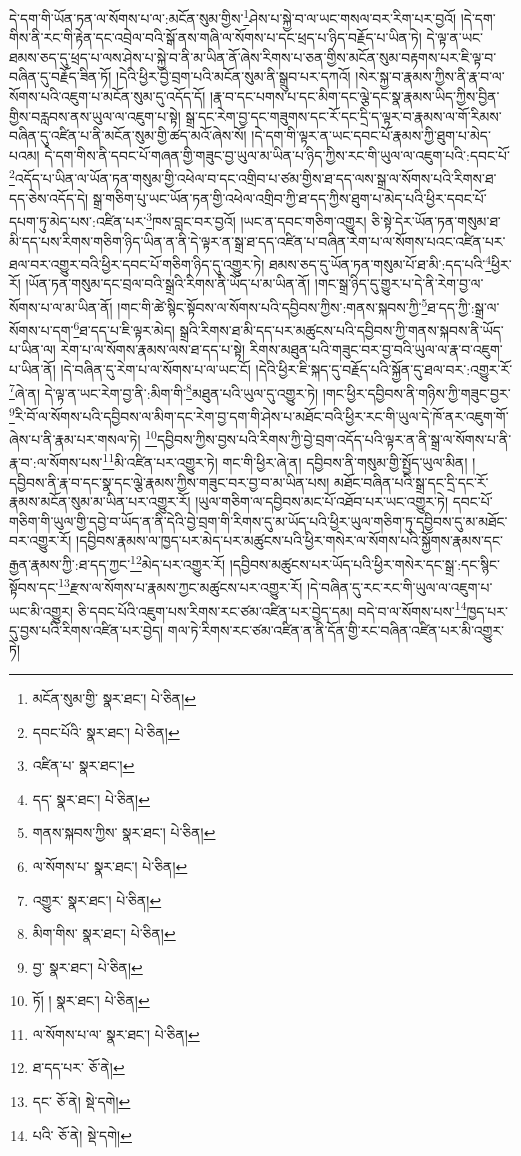 དེ་དག་གི་ཡོན་ཏན་ལ་སོགས་པ་ལ་:མངོན་སུམ་གྱིས་\footnote{མངོན་སུམ་གྱི་  སྣར་ཐང་།  པེ་ཅིན། }ཤེས་པ་སྐྱེ་བ་ལ་ཡང་གསལ་བར་རིག་པར་བྱའོ། །དེ་དག་གིས་ནི་རང་གི་རྟེན་དང་འབྲེལ་བའི་སྒོ་ནས་གཞི་ལ་སོགས་པ་དང་ཕྲད་པ་ཉིད་བརྗོད་པ་ཡིན་ཏེ། དེ་ལྟ་ན་ཡང་ཐམས་ཅད་དུ་ཕྲད་པ་ལས་ཤེས་པ་སྐྱེ་བ་ནི་མ་ཡིན་ནོ་ཞེས་རིགས་པ་ཅན་གྱིས་མངོན་སུམ་བརྟགས་པར་ཇི་ལྟ་བ་བཞིན་དུ་བརྗོད་ཟིན་ཏོ། །དེའི་ཕྱིར་བྱེ་བྲག་པའི་མངོན་སུམ་ནི་སྒྲུབ་པར་དཀའོ། །སེར་སྐྱ་བ་རྣམས་ཀྱིས་ནི་རྣ་བ་ལ་སོགས་པའི་འཇུག་པ་མངོན་སུམ་དུ་འདོད་དོ། །རྣ་བ་དང་པགས་པ་དང་མིག་དང་ལྕེ་དང་སྣ་རྣམས་ཡིད་ཀྱིས་བྱིན་གྱིས་བརླབས་ནས་ཡུལ་ལ་འཇུག་པ་སྟེ། སྒྲ་དང་རེག་བྱ་དང་གཟུགས་དང་རོ་དང་དྲི་ད་ལྟར་བ་རྣམས་ལ་གོ་རིམས་བཞིན་དུ་འཛིན་པ་ནི་མངོན་སུམ་གྱི་ཚད་མའོ་ཞེས་སོ། །དེ་དག་གི་ལྟར་ན་ཡང་དབང་པོ་རྣམས་ཀྱི་ཐུག་པ་མེད་པའམ། དེ་དག་གིས་ནི་དབང་པོ་གཞན་གྱི་གཟུང་བྱ་ཡུལ་མ་ཡིན་པ་ཉིད་ཀྱིས་རང་གི་ཡུལ་ལ་འཇུག་པའི་:དབང་པོ་\footnote{དབང་པོའི་  སྣར་ཐང་།  པེ་ཅིན། }འདོད་པ་ཡིན་ལ་ཡོན་ཏན་གསུམ་གྱི་འཕེལ་བ་དང་འགྲིབ་པ་ཙམ་གྱིས་ཐ་དད་ལས་སྒྲ་ལ་སོགས་པའི་རིགས་ཐ་དད་ཅེས་འདོད་དེ། སྒྲ་གཅིག་པུ་ཡང་ཡོན་ཏན་གྱི་འཕེལ་འགྲིབ་ཀྱི་ཐ་དད་ཀྱིས་ཐུག་པ་མེད་པའི་ཕྱིར་དབང་པོ་དཔག་ཏུ་མེད་པས་:འཛིན་པར་\footnote{འཛིན་པ་  སྣར་ཐང་། }ཁས་བླང་བར་བྱའོ། །ཡང་ན་དབང་གཅིག་འགྱུར། ཅི་སྟེ་དེར་ཡོན་ཏན་གསུམ་ཐ་མི་དད་པས་རིགས་གཅིག་ཉིད་ཡིན་ན་ནི་དེ་ལྟར་ན་སྒྲ་ཐ་དད་འཛིན་པ་བཞིན་རེག་པ་ལ་སོགས་པའང་འཛིན་པར་ཐལ་བར་འགྱུར་བའི་ཕྱིར་དབང་པོ་གཅིག་ཉིད་དུ་འགྱུར་ཏེ། ཐམས་ཅད་དུ་ཡོན་ཏན་གསུམ་པོ་ཐ་མི་:དད་པའི་\footnote{དད་  སྣར་ཐང་།  པེ་ཅིན། }ཕྱིར་རོ། །ཡོན་ཏན་གསུམ་དང་བྲལ་བའི་སྒྲའི་རིགས་ནི་ཡོད་པ་མ་ཡིན་ནོ། །གང་སྒྲ་ཉིད་དུ་གྱུར་པ་དེ་ནི་རེག་བྱ་ལ་སོགས་པ་ལ་མ་ཡིན་ནོ། །གང་གི་ཚེ་སྙིང་སྟོབས་ལ་སོགས་པའི་དབྱིབས་ཀྱིས་:གནས་སྐབས་ཀྱི་\footnote{གནས་སྐབས་ཀྱིས་  སྣར་ཐང་།  པེ་ཅིན། }ཐ་དད་ཀྱི་:སྒྲ་ལ་སོགས་པ་དག་\footnote{ལ་སོགས་པ་  སྣར་ཐང་།  པེ་ཅིན། }ཐ་དད་པ་ཇི་ལྟར་མེད། སྒྲའི་རིགས་ཐ་མི་དད་པར་མཚུངས་པའི་དབྱིབས་ཀྱི་གནས་སྐབས་ནི་ཡོད་པ་ཡིན་ལ། རེག་པ་ལ་སོགས་རྣམས་ལས་ཐ་དད་པ་སྟེ། རིགས་མཐུན་པའི་གཟུང་བར་བྱ་བའི་ཡུལ་ལ་རྣ་བ་འཇུག་པ་ཡིན་ནོ། །དེ་བཞིན་དུ་རེག་པ་ལ་སོགས་པ་ལ་ཡང་ངོ། །དེའི་ཕྱིར་ཇི་སྐད་དུ་བརྗོད་པའི་སྐྱོན་དུ་ཐལ་བར་:འགྱུར་རོ་\footnote{འགྱུར་  སྣར་ཐང་།  པེ་ཅིན། }ཞེ་ན། དེ་ལྟ་ན་ཡང་རེག་བྱ་ནི་:མིག་གི་\footnote{མིག་གིས་  སྣར་ཐང་།  པེ་ཅིན། }མཐུན་པའི་ཡུལ་དུ་འགྱུར་ཏེ། །གང་ཕྱིར་དབྱིབས་ནི་གཉིས་ཀྱི་གཟུང་བྱར་\footnote{བྱ་  སྣར་ཐང་།  པེ་ཅིན། }རི་བོ་ལ་སོགས་པའི་དབྱིབས་ལ་མིག་དང་རེག་བྱ་དག་གི་ཤེས་པ་མཐོང་བའི་ཕྱིར་རང་གི་ཡུལ་དེ་ཁོ་ནར་འཇུག་གོ་ཞེས་པ་ནི་རྣམ་པར་གསལ་ཏེ། \footnote{ཏོ། །   སྣར་ཐང་།  པེ་ཅིན། }དབྱིབས་ཀྱིས་བྱས་པའི་རིགས་ཀྱི་བྱེ་བྲག་འདོད་པའི་ལྟར་ན་ནི་སྒྲ་ལ་སོགས་པ་ནི་རྣ་བ་:ལ་སོགས་པས་\footnote{ལ་སོགས་པ་ལ་  སྣར་ཐང་།  པེ་ཅིན། }མི་འཛིན་པར་འགྱུར་ཏེ། གང་གི་ཕྱིར་ཞེ་ན། དབྱིབས་ནི་གསུམ་གྱི་སྤྱོད་ཡུལ་མིན། །དབྱིབས་ནི་རྣ་བ་དང་སྣ་དང་ལྕེ་རྣམས་ཀྱིས་གཟུང་བར་བྱ་བ་མ་ཡིན་པས། མཐོང་བཞིན་པའི་སྒྲ་དང་དྲི་དང་རོ་རྣམས་མངོན་སུམ་མ་ཡིན་པར་འགྱུར་རོ། །ཡུལ་གཅིག་ལ་དབྱིབས་མང་པོ་འཐོབ་པར་ཡང་འགྱུར་ཏེ། དབང་པོ་གཅིག་གི་ཡུལ་གྱི་དབྱེ་བ་ཡོད་ན་ནི་དེའི་བྱེ་བྲག་གི་རིགས་དུ་མ་ཡོད་པའི་ཕྱིར་ཡུལ་གཅིག་ཏུ་དབྱིབས་དུ་མ་མཐོང་བར་འགྱུར་རོ། །དབྱིབས་རྣམས་ལ་ཁྱད་པར་མེད་པར་མཚུངས་པའི་ཕྱིར་གསེར་ལ་སོགས་པའི་སྐྱོགས་རྣམས་དང་རྒྱན་རྣམས་ཀྱི་:ཐ་དད་ཀྱང་\footnote{ཐ་དད་པར་  ཅོ་ནེ། }མེད་པར་འགྱུར་རོ། །དབྱིབས་མཚུངས་པར་ཡོད་པའི་ཕྱིར་གསེར་དང་སྒྲ་:དང་སྙིང་སྟོབས་དང་\footnote{དང་  ཅོ་ནེ།  སྡེ་དགེ། }རྫས་ལ་སོགས་པ་རྣམས་ཀྱང་མཚུངས་པར་འགྱུར་རོ། །དེ་བཞིན་དུ་རང་རང་གི་ཡུལ་ལ་འཇུག་པ་ཡང་མི་འགྱུར། ཅི་དབང་པོའི་འཇུག་པས་རིགས་རང་ཙམ་འཛིན་པར་བྱེད་དམ། བདེ་བ་ལ་སོགས་པས་\footnote{པའི་  ཅོ་ནེ།  སྡེ་དགེ། }ཁྱད་པར་དུ་བྱས་པའི་རིགས་འཛིན་པར་བྱེད། གལ་ཏེ་རིགས་རང་ཙམ་འཛིན་ན་ནི་དོན་གྱི་རང་བཞིན་འཛིན་པར་མི་འགྱུར་ཏེ། 